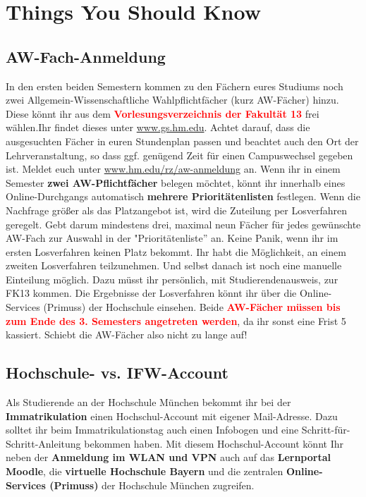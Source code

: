 \section{Things You Should Know}

\subsection{AW-Fach-Anmeldung}

In den ersten beiden Semestern kommen zu den Fächern eures Studiums noch zwei Allgemein-Wissenschaftliche Wahlpflichtfächer (kurz AW-Fächer) hinzu. Diese könnt ihr aus dem \textcolor{red}{\textbf{Vorlesungsverzeichnis der Fakultät 13}} frei wählen.Ihr findet dieses unter \url{www.gs.hm.edu}. Achtet darauf, dass die ausgesuchten Fächer in euren Stundenplan passen und beachtet auch den Ort der Lehrveranstaltung, so dass ggf. genügend Zeit für einen Campuswechsel gegeben ist.\doublebreak
Meldet euch unter \url{www.hm.edu/rz/aw-anmeldung} an.\doublebreak
Wenn ihr in einem Semester \textbf{zwei AW-Pflichtfächer} belegen möchtet, könnt ihr innerhalb eines Online-Durchgangs automatisch \textbf{mehrere Prioritätenlisten} festlegen. Wenn die Nachfrage größer als das Platzangebot ist, wird die Zuteilung per Losverfahren geregelt. Gebt darum mindestens drei, maximal neun Fächer für jedes gewünschte AW-Fach zur Auswahl in der "Prioritätenliste'' an. Keine Panik, wenn ihr im ersten Losverfahren keinen Platz bekommt. Ihr habt die Möglichkeit, an einem zweiten Losverfahren teilzunehmen. Und selbst danach ist noch eine manuelle Einteilung möglich. Dazu müsst ihr persönlich, mit Studierendenausweis, zur FK13 kommen.\doublebreak
Die Ergebnisse der Losverfahren könnt ihr über die Online-Services (Primuss) der Hochschule einsehen.\doublebreak
Beide \textcolor{red}{\textbf{AW-Fächer müssen bis zum Ende des 3. Semesters angetreten werden}}, da ihr sonst eine Frist 5 kassiert. Schiebt die AW-Fächer also nicht zu lange auf! 

\subsection{Hochschule- vs. IFW-Account}

Als Studierende an der Hochschule München bekommt ihr bei der \textbf{Immatrikulation} einen Hochschul-Account mit eigener Mail-Adresse. Dazu solltet ihr beim Immatrikulationstag auch einen Infobogen und eine Schritt-für-Schritt-Anleitung bekommen haben.\doublebreak
Mit diesem Hochschul-Account könnt Ihr neben der \textbf{Anmeldung im WLAN und VPN} auch auf das \textbf{Lernportal Moodle}, die \textbf{virtuelle Hochschule Bayern} und die zentralen \textbf{Online-Services (Primuss)} der Hochschule München zugreifen.


